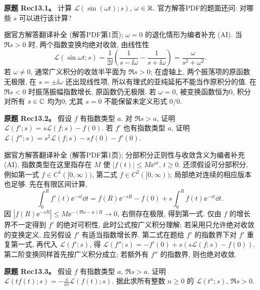 \begin{exercise}
\textbf{原题 Rec13.1。}\label{ass:rec13-1}
计算 $\mathcal L(\sin(\omega t);s)$, $\omega\in\mathbb R$. 官方解答PDF的题面还问: 对哪些 $s$ 可以进行该计算?
\end{exercise}
\begin{solution}
据官方解答翻译补全 (解答PDF第1页); $\omega=0$ 的退化情形为编者补充 (AI). 当 $\Re s>0$ 时, 两个指数变换均绝对收敛, 由线性性
\[
\mathcal L(\sin\omega t;s)=\frac1{2\ii}\left(\frac1{s-\ii\omega}-\frac1{s+\ii\omega}\right)=\frac{\omega}{s^2+\omega^2}.
\]
若 $\omega\ne0$, 通常广义积分的收敛半平面为 $\Re s>0$; 在虚轴上, 两个振荡项的原函数无极限, 在 $s=\pm\ii\omega$ 还出现线性项, 所以有理式的亚纯延拓不能当作原积分的值. 在 $\Re s<0$ 时振荡振幅指数增长, 原函数仍无极限. 若 $\omega=0$, 被变换函数恒为0, 积分对所有 $s\in\mathbb C$ 均为0; 尤其 $s=0$ 不能保留未定义形式 $0/0$.
\end{solution}
\begin{exercise}
\textbf{原题 Rec13.2。}\label{ass:rec13-2}
假设 $f$ 有指数类型 $a$. 对 $\Re s>a$, 证明 $\mathcal L(f';s)=s\mathcal L(f;s)-f(0)$. 若 $f'$ 也有指数类型 $a$, 证明 $\mathcal L(f'';s)=s^2\mathcal L(f;s)-sf(0)-f'(0)$.
\end{exercise}
\begin{solution}
据官方解答翻译补全 (解答PDF第1页); 分部积分正则性与收敛含义为编者补充 (AI). 指数类型在这里指存在 $M$ 使 $|f(t)|\le M\ee^{at}$, $t\ge0$. 还须假设可分部积分, 例如第一式 $f\in C^1([0,\infty))$, 第二式 $f\in C^2([0,\infty))$; 局部绝对连续的相应版本也足够. 先在有限区间计算,
\[
\int_0^R f'(t)\ee^{-st}\dd t=f(R)\ee^{-sR}-f(0)+s\int_0^R f(t)\ee^{-st}\dd t.
\]
因 $|f(R)\ee^{-sR}|\le M\ee^{-(\Re s-a)R}\to0$, 右侧存在极限, 得到第一式. 仅由 $f$ 的增长界不一定得到 $f'$ 的绝对可积性, 此时公式按广义积分理解; 若采用只允许绝对收敛的变换定义, 应另假设 $f'$ 有适当指数增长界. 第二式在题给 $f'$ 的指数界下对 $f'$ 重复第一式, 再代入 $\mathcal L(f';s)$, 得 $\mathcal L(f'';s)=-f'(0)+s(s\mathcal L(f;s)-f(0))$. 第二阶变换同样首先按广义积分成立; 若额外有 $f''$ 的指数界, 则也绝对收敛.
\end{solution}
\begin{exercise}
\textbf{原题 Rec13.3。}\label{ass:rec13-3}
假设 $f$ 有指数类型 $a$, $\Re s>a$. 证明 $\mathcal L(tf(t);s)=-\frac{\dd}{\dd s}\mathcal L(f(t);s)$. 据此求所有整数 $n\ge0$ 的 $\mathcal L(t^n;s)$, $\Re s>0$.
\end{exercise}
